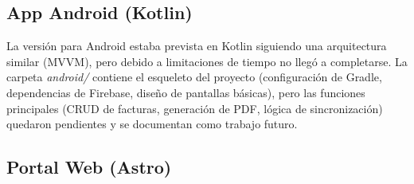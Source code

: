 \subsection{App Android (Kotlin)}

\begin{large}

La versión para Android estaba prevista en Kotlin siguiendo una arquitectura similar (MVVM), pero debido a limitaciones de tiempo no llegó a completarse. La carpeta \textit{android/} contiene el esqueleto del proyecto (configuración de Gradle, dependencias de Firebase, diseño de pantallas básicas), pero las funciones principales (CRUD de facturas, generación de PDF, lógica de sincronización) quedaron pendientes y se documentan como trabajo futuro.

\end{large}

\subsection{Portal Web (Astro)}

